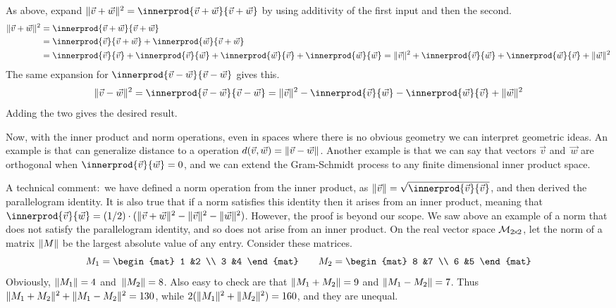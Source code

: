As above, expand
$
  \norm{\vec{v}+\vec{w}}^2=\innerprod{\vec{v}+\vec{w}}{\vec{v}+\vec{w}}
$
by using additivity of the first input and then the second. 
\begin{align*}
  \norm{\vec{v}+\vec{w}}^2
  &=\innerprod{\vec{v}+\vec{w}}{\vec{v}+\vec{w}}           \\
  &=\innerprod{\vec{v}}{\vec{v}+\vec{w}}+\innerprod{\vec{w}}{\vec{v}+\vec{w}} \\
  &=\innerprod{\vec{v}}{\vec{v}}            
   +\innerprod{\vec{v}}{\vec{w}}
   +\innerprod{\vec{w}}{\vec{v}}
   +\innerprod{\vec{w}}{\vec{w}}
  =\norm{\vec{v}}^2            
   +\innerprod{\vec{v}}{\vec{w}}
   +\innerprod{\vec{w}}{\vec{v}}
   +\norm{\vec{w}}^2
\end{align*}
The same expansion for $\innerprod{\vec{v}-\vec{w}}{\vec{v}-\vec{w}}$
gives this.
\begin{equation*}
  \norm{\vec{v}-\vec{w}}^2
  =\innerprod{\vec{v}-\vec{w}}{\vec{v}-\vec{w}}
  =\norm{\vec{v}}^2
   -\innerprod{\vec{v}}{\vec{w}}
   -\innerprod{\vec{w}}{\vec{v}}
   +\norm{\vec{w}}^2
\end{equation*}
Adding the two gives the desired result. 

Now, with the inner product and norm operations, 
even in spaces where there is no obvious geometry
we can interpret geometric ideas. 
An example is that can generalize distance to a
operation
$d(\vec{v},\vec{w})=\lVert\vec{v}-\vec{w}\rVert$.
Another example is that we can say that
vectors $\vec{v}$ and~$\vec{w}$ are orthogonal when 
$\innerprod{\vec{v}}{\vec{w}}=0$,
and we can extend the Gram-Schmidt process
to any finite dimensional inner product space.

A technical comment:~we have defined a norm operation from the inner product, 
as $\norm{\vec{v}}=\sqrt{\smashdp{\innerprod{\vec{v}}{\vec{v}}}}$,
and then derived the parallelogram identity.
It is also true that if a norm satisfies this identity then it
arises from an inner product, 
meaning that 
$\innerprod{\vec{v}}{\vec{w}}
  =(1/2)\cdot(\norm{\vec{v}+\vec{w}}^2-\norm{\vec{v}}^2-\norm{\vec{w}}^2)$.
However, the proof is beyond our scope.
We saw above an example of a norm that does not satisfy the parallelogram 
identity, 
and so does not arise from an inner product.
On the real vector space $\mathcal{M}_{2 \! \times \! 2}$, let the
norm of a matrix $\lVert M\rVert$ be the largest absolute value of any entry.
Consider these matrices.
\begin{equation*}
  M_1=
  \begin{mat}
  1  &2 \\
  3  &4  
  \end{mat}
  \qquad
  M_2=
  \begin{mat}
  8  &7  \\
  6  &5
  \end{mat}
\end{equation*}
Obviously, $\lVert M_1\rVert=4$ and~$\lVert M_2\rVert=8$.
Also easy to check are that $\lVert M_1+M_2\rVert=9$
and $\lVert M_1-M_2\rVert=7$.
Thus $\lVert M_1+M_2\rVert^2+\lVert M_1-M_2\rVert^2=130$, 
while $2(\lVert M_1\rVert^2+\lVert M_2\rVert^2)=160$,
and they are unequal.

